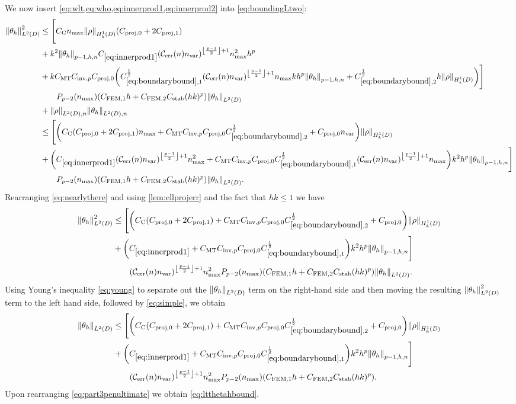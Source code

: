We now insert \cref{eq:wlt,eq:who,eq:innerprod1,eq:innerprod2} into \cref{eq:boundingLtwo}:
\begin{align}
\NLtD{\thetah}^2 &\leq \Bigg[\Cc\nmax \NHokD{\rho} \mleft(\Cprojfn{0} + 2\Cprojfn{1}\mright)\\
&+k^2\Nfn{p-1,h,n}{\thetah}  \Cfourteen \mleft(\En \nvar\mright)^{\floor{\frac{p-1}2}+1}\nmax^2 h^p \\
&+k\CMT \CinvVhp \Cprojfn{0} \mleft(\Cboundaryo^{\half} \mleft(\En\nvar\mright)^{\floor{\frac{p-1}2}+1}\nmax k h^{p} \Nfn{p-1,h,n}{\thetah} + \Cboundaryt^{\half} h \NHokD{\rho}\mright)\Bigg]\nonumber\\
&\quad\quad \Pfn{p-2}\mleft(\nmax\mright)\mleft(\CFEMotilde h + \CFEMttilde \CAnk (hk)^p\mright)\NLtD{\thetah}\\
&+\NLtDn{\rho}\NLtDn{\thetah}\nonumber\\
&\leq \Bigg[\mleft(\Cc\mleft(\Cprojfn{0} + 2\Cprojfn{1}\mright)\nmax + \CMT \CinvVhp \Cprojfn{0} \Cboundaryt^{\half} + \Cprojfn{0}\nvar  \mright)\NHokD{\rho} \\
&+\mleft(  \Cfourteen \mleft(\En \nvar\mright)^{\floor{\frac{p-1}2}+1}\nmax^2 + \CMT \CinvVhp \Cprojfn{0}\Cboundaryo^{\half} \mleft(\En\nvar\mright)^{\floor{\frac{p-1}2}+1}\nmax\mright)k^2h^p\Nfn{p-1,h,n}{\thetah}\Bigg]\nonumber\\
&\quad\quad \Pfn{p-2}\mleft(\nmax\mright)\mleft(\CFEMotilde h + \CFEMttilde \CAnk (hk)^p\mright)\NLtD{\thetah}.\label{eq:nearlythere}
\end{align}
Rearranging \cref{eq:nearlythere} and using \cref{lem:ellprojerr} and the fact that $hk \leq 1$ we have
  \begin{align*}
\NLtD{\thetah}^2&\leq \Bigg[\mleft(\Cc\mleft(\Cprojfn{0} + 2\Cprojfn{1}\mright) + \CMT \CinvVhp \Cprojfn{0} \Cboundaryt^{\half} + \Cprojfn{0}  \mright)\NHokD{\rho} \nonumber\\
&+\mleft(  \Cfourteen  + \CMT \CinvVhp \Cprojfn{0}\Cboundaryo^{\half} \mright)k^2h^p\Nfn{p-1,h,n}{\thetah}\Bigg]\nonumber\\
&\quad\quad \mleft(\En \nvar\mright)^{\floor{\frac{p-1}2}+1}\nmax^2\Pfn{p-2}\mleft(\nmax\mright)\mleft(\CFEMotilde h + \CFEMttilde \CAnk (hk)^p\mright)\NLtD{\thetah}.
\end{align*}
  Using Young's inequality \cref{eq:young} to separate out the $\NLtD{\thetah}$ term on the right-hand side and then moving the resulting $\NLtD{\thetah}^2$ term to the left hand side, followed by \cref{eq:simple}, we obtain
\begin{align}
\NLtD{\thetah}&\leq \Bigg[\mleft(\Cc\mleft(\Cprojfn{0} + 2\Cprojfn{1}\mright) + \CMT \CinvVhp \Cprojfn{0} \Cboundaryt^{\half} + \Cprojfn{0}  \mright)\NHokD{\rho}\nonumber \\
&+\mleft(  \Cfourteen  + \CMT \CinvVhp \Cprojfn{0}\Cboundaryo^{\half} \mright)k^2h^p\Nfn{p-1,h,n}{\thetah}\Bigg]\nonumber\\
&\quad\quad \mleft(\En \nvar\mright)^{\floor{\frac{p-1}2}+1}\nmax^2\Pfn{p-2}\mleft(\nmax\mright)\mleft(\CFEMotilde h + \CFEMttilde \CAnk (hk)^p\mright)\label{eq:part3penultimate}.
\end{align}
Upon rearranging \cref{eq:part3penultimate} we obtain \cref{eq:ltthetahbound}.
\epf

